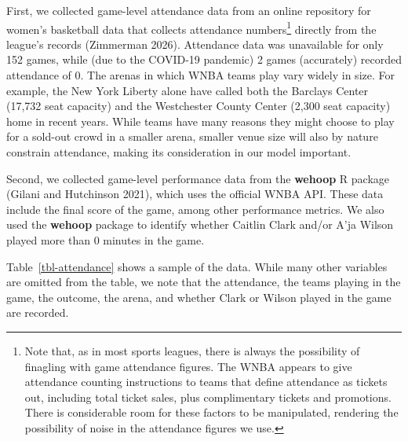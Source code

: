 \documentclass[
  letterpaper,
  DIV=11,
  numbers=noendperiod]{scrartcl}
\begin{document}
First, we collected game-level attendance data from an online repository
for women's basketball data that collects attendance numbers\footnote{Note
  that, as in most sports leagues, there is always the possibility of
  finagling with game attendance figures. The WNBA appears to give
  attendance counting instructions to teams that define attendance as
  tickets out, including total ticket sales, plus complimentary tickets
  and promotions. There is considerable room for these factors to be
  manipulated, rendering the possibility of noise in the attendance
  figures we use.} directly from the league's records (Zimmerman 2026).
Attendance data was unavailable for only 152 games, while (due to the
COVID-19 pandemic) 2 games (accurately) recorded attendance of 0. The
arenas in which WNBA teams play vary widely in size. For example, the
New York Liberty alone have called both the Barclays Center (17,732 seat
capacity) and the Westchester County Center (2,300 seat capacity) home
in recent years. While teams have many reasons they might choose to play
for a sold-out crowd in a smaller arena, smaller venue size will also by
nature constrain attendance, making its consideration in our model
important.

Second, we collected game-level performance data from the
\textbf{wehoop} R package (Gilani and Hutchinson 2021), which uses the
official WNBA API. These data include the final score of the game, among
other performance metrics. We also used the \textbf{wehoop} package to
identify whether Caitlin Clark and/or A'ja Wilson played more than 0
minutes in the game.

Table~\ref{tbl-attendance} shows a sample of the data. While many other
variables are omitted from the table, we note that the attendance, the
teams playing in the game, the outcome, the arena, and whether Clark or
Wilson played in the game are recorded.
\end{document}
